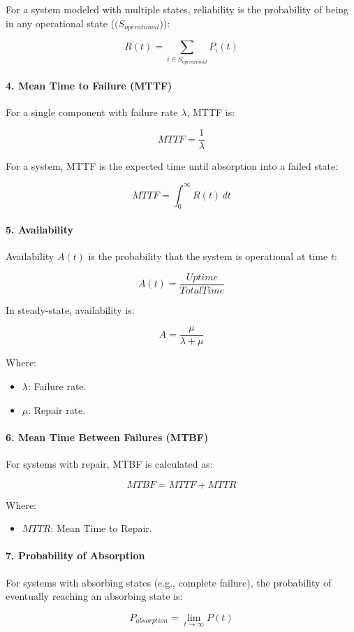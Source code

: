 \documentclass[a4paper,12pt]{article}
\begin{document}
	\begin{answerbox}
		For a system modeled with multiple states, reliability is the probability of being in any operational state ($( S_{operational} $)):
		
		\[
		R(t) = \sum_{i \in S_{operational}} P_i(t)
		\]
		
		\paragraph{4. Mean Time to Failure (MTTF)}
		For a single component with failure rate \( \lambda \), MTTF is:
		
		\[
		{MTTF} = \frac{1}{\lambda}
		\]
		
		For a system, MTTF is the expected time until absorption into a failed state:
		
		\[
		{MTTF} = \int_0^\infty R(t) \, dt
		\]
		
		\paragraph{5. Availability}
		Availability \( A(t) \) is the probability that the system is operational at time \( t \):
		
		\[
		A(t) = \frac{Uptime}{Total Time}
		\]
		
		In steady-state, availability is:
		
		\[
		A = \frac{\mu}{\lambda + \mu}
		\]
		
		Where:
		\begin{itemize}
			\item \( \lambda \): Failure rate.
			\item \( \mu \): Repair rate.
		\end{itemize}
		
		\paragraph{6. Mean Time Between Failures (MTBF)}
		For systems with repair, MTBF is calculated as:
		
		\[
		{MTBF} = {MTTF} + {MTTR}
		\]
		
		Where:
		\begin{itemize}
			\item \( {MTTR} \): Mean Time to Repair.
		\end{itemize}
		
		\paragraph{7. Probability of Absorption}
		For systems with absorbing states (e.g., complete failure), the probability of eventually reaching an absorbing state is:
		
		\[
		P_{{absorption}} = \lim_{t \to \infty} P(t)
		\]
		
	\end{answerbox}
	
\end{document}
